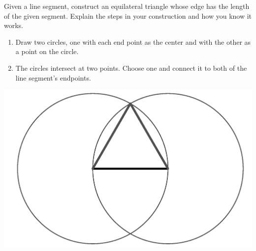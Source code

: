 \documentclass[nooutcomes]{ximera}
\begin{document}
\begin{problem}
Given a line segment, construct an equilateral triangle whose edge has the length of the given segment. Explain the steps in your construction and how you know it works.
\begin{freeResponse}
\begin{hint}%
\begin{enumerate} 
\item Draw two circles, one with each end point as the center and with the other as a point on the circle. 
\item The circles intersect at two points.  Choose one and 
connect it to both of the line segment's endpoints.
\end{enumerate}
\begin{image}
\includegraphics{eqtri.png}
\end{image}
\end{hint}
\end{freeResponse}
\end{problem}
\end{document}

